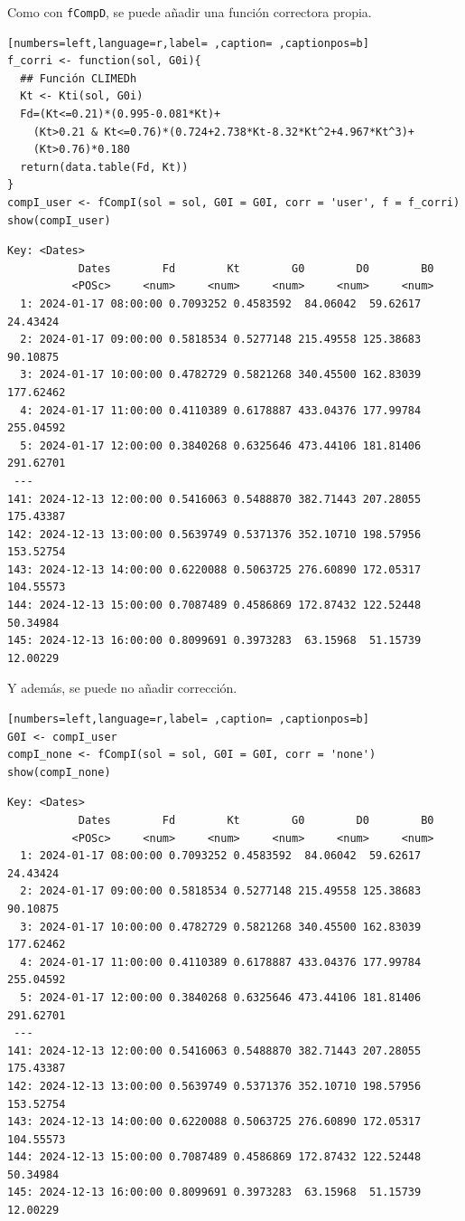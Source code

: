 \begin{itemize}
Como con \texttt{fCompD}, se puede añadir una función correctora propia.
\begin{lstlisting}[numbers=left,language=r,label= ,caption= ,captionpos=b]
f_corri <- function(sol, G0i){
  ## Función CLIMEDh
  Kt <- Kti(sol, G0i)
  Fd=(Kt<=0.21)*(0.995-0.081*Kt)+
    (Kt>0.21 & Kt<=0.76)*(0.724+2.738*Kt-8.32*Kt^2+4.967*Kt^3)+
    (Kt>0.76)*0.180
  return(data.table(Fd, Kt))
}
compI_user <- fCompI(sol = sol, G0I = G0I, corr = 'user', f = f_corri)
show(compI_user)
\end{lstlisting}

\begin{verbatim}
Key: <Dates>
		   Dates        Fd        Kt        G0        D0        B0
		  <POSc>     <num>     <num>     <num>     <num>     <num>
  1: 2024-01-17 08:00:00 0.7093252 0.4583592  84.06042  59.62617  24.43424
  2: 2024-01-17 09:00:00 0.5818534 0.5277148 215.49558 125.38683  90.10875
  3: 2024-01-17 10:00:00 0.4782729 0.5821268 340.45500 162.83039 177.62462
  4: 2024-01-17 11:00:00 0.4110389 0.6178887 433.04376 177.99784 255.04592
  5: 2024-01-17 12:00:00 0.3840268 0.6325646 473.44106 181.81406 291.62701
 ---                                                                      
141: 2024-12-13 12:00:00 0.5416063 0.5488870 382.71443 207.28055 175.43387
142: 2024-12-13 13:00:00 0.5639749 0.5371376 352.10710 198.57956 153.52754
143: 2024-12-13 14:00:00 0.6220088 0.5063725 276.60890 172.05317 104.55573
144: 2024-12-13 15:00:00 0.7087489 0.4586869 172.87432 122.52448  50.34984
145: 2024-12-13 16:00:00 0.8099691 0.3973283  63.15968  51.15739  12.00229
\end{verbatim}

Y además, se puede no añadir corrección.
\begin{lstlisting}[numbers=left,language=r,label= ,caption= ,captionpos=b]
G0I <- compI_user
compI_none <- fCompI(sol = sol, G0I = G0I, corr = 'none')
show(compI_none)
\end{lstlisting}

\begin{verbatim}
Key: <Dates>
		   Dates        Fd        Kt        G0        D0        B0
		  <POSc>     <num>     <num>     <num>     <num>     <num>
  1: 2024-01-17 08:00:00 0.7093252 0.4583592  84.06042  59.62617  24.43424
  2: 2024-01-17 09:00:00 0.5818534 0.5277148 215.49558 125.38683  90.10875
  3: 2024-01-17 10:00:00 0.4782729 0.5821268 340.45500 162.83039 177.62462
  4: 2024-01-17 11:00:00 0.4110389 0.6178887 433.04376 177.99784 255.04592
  5: 2024-01-17 12:00:00 0.3840268 0.6325646 473.44106 181.81406 291.62701
 ---                                                                      
141: 2024-12-13 12:00:00 0.5416063 0.5488870 382.71443 207.28055 175.43387
142: 2024-12-13 13:00:00 0.5639749 0.5371376 352.10710 198.57956 153.52754
143: 2024-12-13 14:00:00 0.6220088 0.5063725 276.60890 172.05317 104.55573
144: 2024-12-13 15:00:00 0.7087489 0.4586869 172.87432 122.52448  50.34984
145: 2024-12-13 16:00:00 0.8099691 0.3973283  63.15968  51.15739  12.00229
\end{verbatim}


\end{itemize}
